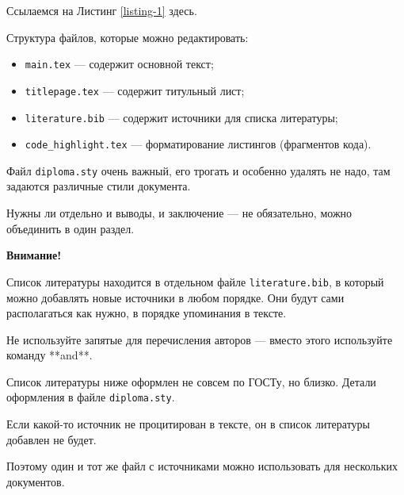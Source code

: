 \documentclass[a4paper,14pt]{extarticle}
\begin{document}
Ссылаемся на Листинг \ref{listing-1} здесь.

\pagebreak
{}
Структура файлов, которые можно редактировать:

\begin{itemize}
    \item \verb|main.tex| --- содержит основной текст;
    \item \verb|titlepage.tex| --- содержит титульный лист;
    \item \verb|literature.bib| --- содержит источники для списка литературы;
    \item \verb|code_highlight.tex| --- форматирование листингов (фрагментов кода).
\end{itemize}

Файл \verb|diploma.sty| очень важный, его трогать и особенно удалять не надо, там задаются различные стили документа.

Нужны ли отдельно и выводы, и заключение --- не обязательно, можно объединить в один раздел.

\textbf{Внимание!} 

Список литературы находится в отдельном файле \verb|literature.bib|, в который можно добавлять новые источники в любом порядке. Они будут сами располагаться как нужно, в порядке упоминания в тексте.

Не используйте запятые для перечисления авторов --- вместо этого используйте команду **and**. 

Список литературы ниже оформлен не совсем по ГОСТу, но близко. Детали оформления в файле \verb|diploma.sty|.

Если какой-то источник не процитирован в тексте, он в список литературы добавлен не будет.

Поэтому один и тот же файл с источниками можно использовать для нескольких документов.

\printbibliography
\end{document}
